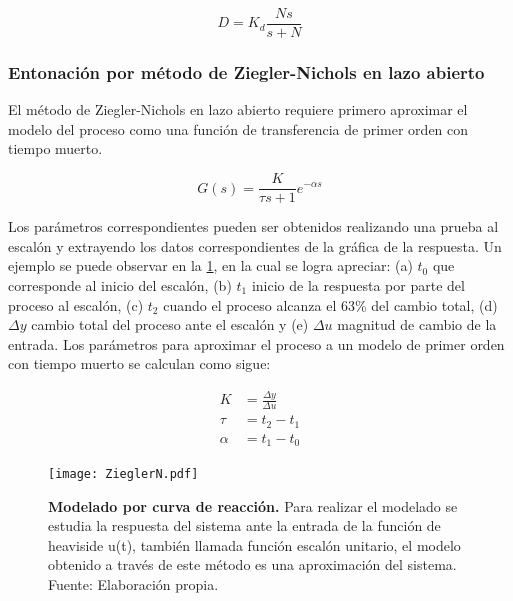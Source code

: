                 \begin{equation}\label{eq:Daproximacion}
                    D = K_d \frac{N s}{s + N}
                \end{equation}

        \subsubsection{Entonación por método de Ziegler-Nichols en lazo abierto}
			
            El método de Ziegler-Nichols en lazo abierto requiere primero aproximar el modelo del proceso como una función de transferencia de primer orden con tiempo muerto.
            
            \begin{equation}\label{eq:firstorderProcess}
                G(s) = \frac{K}{\tau s + 1} e^{-\alpha s}
            \end{equation}
            
            Los parámetros correspondientes pueden ser obtenidos realizando una prueba al escalón y extrayendo los datos correspondientes de la gráfica de la respuesta. Un ejemplo se puede observar en la \cref{fig:ZNtest}, en la cual se logra apreciar: (a) $t_{0}$ que corresponde al inicio del escalón, (b) $t_{1}$ inicio de la respuesta por parte del proceso al escalón, (c) $t_{2}$ cuando el proceso alcanza el 63\% del cambio total, (d) $\Delta y$ cambio total del proceso ante el escalón y (e) $\Delta u$ magnitud de cambio de la entrada. Los parámetros para aproximar el proceso a un modelo de primer orden con tiempo muerto se calculan como sigue:
            
            \begin{align}
                K &= \frac{\Delta y}{\Delta u}\label{eq:parametroK}\\
                \tau &= t_{2} - t_{1}\label{eq:parametroTau}\\
                \alpha &= t_{1} - t_{0}\label{eq:parametroAlfa}
            \end{align}
            
            \begin{figure}[htb]
                \centering
                \texttt{[image: ZieglerN.pdf]}
                \caption[Modelado por curva de reacción]{\textbf{Modelado por curva de reacción.} Para realizar el modelado se estudia la respuesta del sistema ante la entrada de la función de heaviside u(t), también llamada función escalón unitario, el modelo obtenido a través de este método es una aproximación del sistema. Fuente: Elaboración propia.} 
                \label{fig:ZNtest}
            \end{figure}
            
